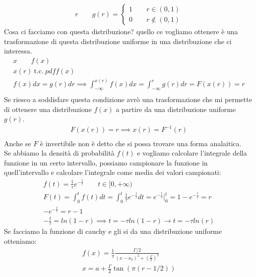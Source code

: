 \documentclass[a4paper, oneside]{article}
\begin{document}
\begin{gather*}
    r \qquad g(r) = \begin{cases}
        1 \qquad r \in (0,1)\\
        0 \qquad r \notin (0,1)
    \end{cases}
\end{gather*}
Cosa ci facciamo con questa distribuzione? quello ce vogliamo ottenere è una trasformazione di questa distribuzione uniforme in una distribuzione che ci interessa.
\begin{gather*}
    x \qquad f(x) \\
    x(r) \ \text{t.c.} \ pdf f(x) \\
    f(x) dx = g(r) dr \implies \int_{-\infty}^{x(r)} f(x) dx = \int_{-\infty}^{r} g(r) dr = F(x(r)) = r \\
\end{gather*}
Se riesco a soddisfare questa condizione avrò una trasformazione che mi permette di ottenere una distribuzione $f(x)$ a partire da una distribuzione uniforme $g(r)$.\\
\begin{gather*}
    F(x(r)) = r \implies x(r) = F^{-1}(r) \\
\end{gather*}
Anche se $F$ è invertibile non è detto che si possa trovare una forma analaitica.\\
Se abbiamo la densità di probabilità $f(t)$ e vogliamo calcolare l'integrale della funzione in un certo intervallo, possiamo campionare la funzione in quell'intervallo e calcolare l'integrale come media dei valori campionati:
\begin{gather*}
    f(t) = \frac{1}{\tau} e^{-\frac{t}{\tau}} \qquad t \in [0, +\infty)\\
    F(t) = \int_{0}^{t} f(t) dt = \int_{0}^{t} \frac{1}{\tau} e^{-\frac{t}{\tau}} dt = e^{-\frac{t}{\tau}}\big|_0^t = 1 - e^{-\frac{t}{\tau}} = r\\
    -e^{-\frac{t}{\tau}} = r - 1\\
    -\frac{t}{\tau} = ln(1 - r) \implies \boxed{t = -\tau ln(1 - r)} \to \boxed{t = -\tau ln(r)}
\end{gather*}
Se facciamo la funzione di cauchy e gli si da una distribuzione uniforme otteniamo:
\begin{gather*}
    f(x) = \frac{1}{\pi} \frac{\Gamma/2}{(x-x_0)^2 + \left(\frac{\Gamma}{2}\right)^2}\\
    x = a + \frac{\Gamma}{2} \tan(\pi (r - 1/2)) \\
\end{gather*}
\end{document}
